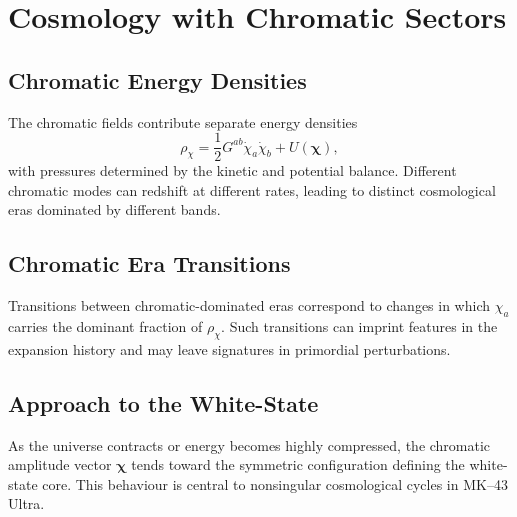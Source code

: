 \chapter{Cosmology with Chromatic Sectors}

\section{Chromatic Energy Densities}

The chromatic fields contribute separate energy densities
\[
  \rho_\chi =
  \frac{1}{2} G^{ab} \dot{\chi}_a \dot{\chi}_b + U(\bm{\chi}),
\]
with pressures determined by the kinetic and potential balance.
Different chromatic modes can redshift at different rates, leading to distinct cosmological eras dominated by different bands.

\section{Chromatic Era Transitions}

Transitions between chromatic-dominated eras correspond to changes in which $\chi_a$ carries the dominant fraction of $\rho_\chi$.
Such transitions can imprint features in the expansion history and may leave signatures in primordial perturbations.

\section{Approach to the White-State}

As the universe contracts or energy becomes highly compressed, the chromatic amplitude vector $\bm{\chi}$ tends toward the symmetric configuration defining the white-state core.
This behaviour is central to nonsingular cosmological cycles in MK--43 Ultra.

